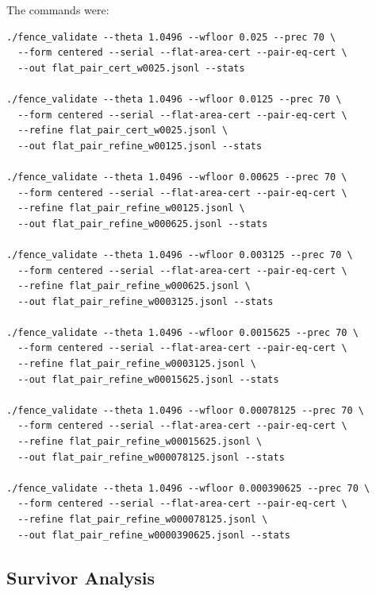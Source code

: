 \documentclass[11pt]{article}
\begin{document}
The commands were:

\begin{lstlisting}
./fence_validate --theta 1.0496 --wfloor 0.025 --prec 70 \
  --form centered --serial --flat-area-cert --pair-eq-cert \
  --out flat_pair_cert_w0025.jsonl --stats

./fence_validate --theta 1.0496 --wfloor 0.0125 --prec 70 \
  --form centered --serial --flat-area-cert --pair-eq-cert \
  --refine flat_pair_cert_w0025.jsonl \
  --out flat_pair_refine_w00125.jsonl --stats

./fence_validate --theta 1.0496 --wfloor 0.00625 --prec 70 \
  --form centered --serial --flat-area-cert --pair-eq-cert \
  --refine flat_pair_refine_w00125.jsonl \
  --out flat_pair_refine_w000625.jsonl --stats

./fence_validate --theta 1.0496 --wfloor 0.003125 --prec 70 \
  --form centered --serial --flat-area-cert --pair-eq-cert \
  --refine flat_pair_refine_w000625.jsonl \
  --out flat_pair_refine_w0003125.jsonl --stats

./fence_validate --theta 1.0496 --wfloor 0.0015625 --prec 70 \
  --form centered --serial --flat-area-cert --pair-eq-cert \
  --refine flat_pair_refine_w0003125.jsonl \
  --out flat_pair_refine_w00015625.jsonl --stats

./fence_validate --theta 1.0496 --wfloor 0.00078125 --prec 70 \
  --form centered --serial --flat-area-cert --pair-eq-cert \
  --refine flat_pair_refine_w00015625.jsonl \
  --out flat_pair_refine_w000078125.jsonl --stats

./fence_validate --theta 1.0496 --wfloor 0.000390625 --prec 70 \
  --form centered --serial --flat-area-cert --pair-eq-cert \
  --refine flat_pair_refine_w000078125.jsonl \
  --out flat_pair_refine_w0000390625.jsonl --stats
\end{lstlisting}

\subsection{Survivor Analysis}
\end{document}
